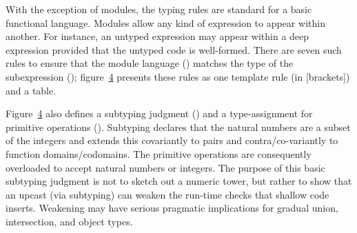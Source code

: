 \documentclass[screen=true, natbib=false, 10pt, sigplan]{acmart}
\newcommand{\FigureRef}[2]{#1}
\begin{document}
With the exception of modules, the typing rules are standard for a basic
functional language.
Modules allow any kind of expression to appear within another.
For instance, an untyped expression may appear within a deep
expression provided that the untyped code is well{-}formed.
There are seven such rules to ensure that the module language ()
matches the type of the subexpression (); figure~\hyperref[t:x28counter_x28x22figurex22_x22figx3amodelx3asurfacex2dtypex22x29x29]{\FigureRef{4}{t:x28counter_x28x22figurex22_x22figx3amodelx3asurfacex2dtypex22x29x29}}
presents these rules as one template rule (in [brackets]) and a table.

Figure~\hyperref[t:x28counter_x28x22figurex22_x22figx3amodelx3asurfacex2dtypex22x29x29]{\FigureRef{4}{t:x28counter_x28x22figurex22_x22figx3amodelx3asurfacex2dtypex22x29x29}} also defines a subtyping judgment (\relax{$\ssubt$})
and a type{-}assignment for primitive operations (\relax{$\sDelta$}).
Subtyping declares that the natural numbers are a subset of the integers
and extends this covariantly to pairs and contra/co{-}variantly to
function domains/codomains.
The primitive operations are consequently overloaded to accept natural numbers or
integers.
The purpose of this basic subtyping judgment is not to sketch out a numeric tower,
but rather to show that an upcast (via subtyping) can weaken the run{-}time
checks that shallow code inserts.
Weakening may have serious pragmatic implications for gradual union,
intersection, and object types.
\end{document}
